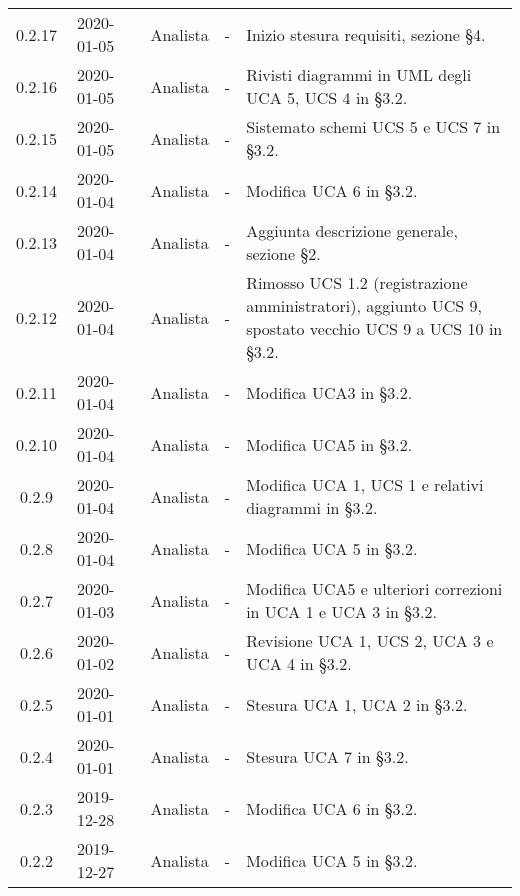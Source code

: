 {\begin{longtable}{ c c  C{2.3cm} c C{3cm} C{3.2cm}}
0.2.17 & 2020-01-05 & \CE{} & Analista & - & Inizio stesura requisiti, sezione §4. \\

0.2.16 & 2020-01-05 & \DF{} & Analista & - & Rivisti diagrammi in UML degli UCA 5, UCS 4 in §3.2. \\

0.2.15 & 2020-01-05 & \PF{} & Analista & - & Sistemato schemi UCS 5 e UCS 7 in §3.2. \\

0.2.14 & 2020-01-04 & \PF{} & Analista & - & Modifica UCA 6 in §3.2. \\

0.2.13 & 2020-01-04 & \CE{} & Analista & - & Aggiunta descrizione generale, sezione §2. \\

0.2.12 & 2020-01-04 & \CE{} & Analista & - & Rimosso UCS 1.2 (registrazione amministratori), aggiunto UCS 9, spostato vecchio UCS 9 a UCS 10 in §3.2. \\

0.2.11 & 2020-01-04 & \PF{} & Analista & - & Modifica UCA3 in §3.2. \\

0.2.10 & 2020-01-04 & \DF{} & Analista & - & Modifica UCA5 in §3.2. \\

0.2.9 & 2020-01-04 & \DF{} & Analista & - & Modifica UCA 1, UCS 1 e relativi diagrammi in §3.2. \\

0.2.8 & 2020-01-04 & \CE{} & Analista & - & Modifica UCA 5 in §3.2. \\

0.2.7 & 2020-01-03 & \CE{} & Analista & - & Modifica UCA5 e ulteriori correzioni in UCA 1 e UCA 3 in §3.2. \\

0.2.6 & 2020-01-02 & \CE{} & Analista & - & Revisione UCA 1, UCS 2, UCA 3 e UCA 4 in §3.2. \\

0.2.5 & 2020-01-01 & \BR{} & Analista & - & Stesura UCA 1, UCA 2 in §3.2. \\

0.2.4 & 2020-01-01 & \PF{} & Analista & - & Stesura UCA 7 in §3.2. \\

0.2.3 & 2019-12-28 & \DF{} & Analista & - & Modifica UCA 6 in §3.2. \\

0.2.2 & 2019-12-27 & \PF{} & Analista & - & Modifica UCA 5 in §3.2. \\


\end{longtable}}
